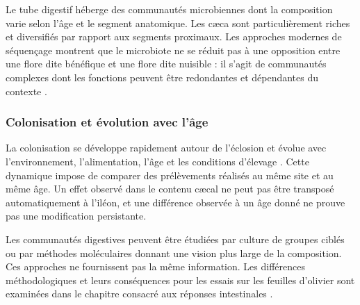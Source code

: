 Le tube digestif héberge des communautés microbiennes dont la composition varie selon l'âge et le segment anatomique. Les cæca sont particulièrement riches et diversifiés par rapport aux segments proximaux. Les approches modernes de séquençage montrent que le microbiote ne se réduit pas à une opposition entre une flore dite bénéfique et une flore dite nuisible : il s'agit de communautés complexes dont les fonctions peuvent être redondantes et dépendantes du contexte \citep{Oakley2014}.

\subsubsection{Colonisation et évolution avec l'âge}

La colonisation se développe rapidement autour de l'éclosion et évolue avec l'environnement, l'alimentation, l'âge et les conditions d'élevage \citep{Oakley2014,RavindranAbdollahi2021}. Cette dynamique impose de comparer des prélèvements réalisés au même site et au même âge. Un effet observé dans le contenu cæcal ne peut pas être transposé automatiquement à l'iléon, et une différence observée à un âge donné ne prouve pas une modification persistante.

Les communautés digestives peuvent être étudiées par culture de groupes ciblés ou par méthodes moléculaires donnant une vision plus large de la composition. Ces approches ne fournissent pas la même information. Les différences méthodologiques et leurs conséquences pour les essais sur les feuilles d'olivier sont examinées dans le chapitre consacré aux réponses intestinales \citep{Oakley2014}.
